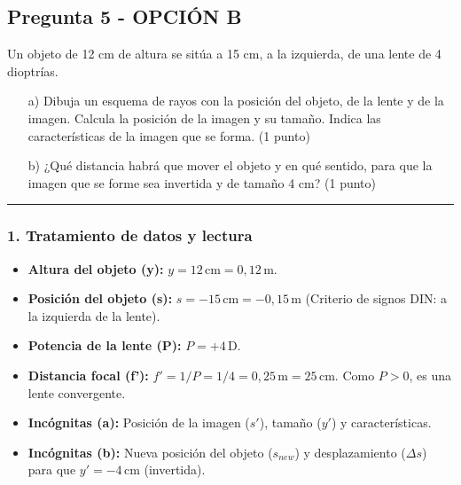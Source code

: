 \subsection{Pregunta 5 - OPCIÓN B}
\label{subsec:5B_2025_jun_ord}

\begin{cajaenunciado}
Un objeto de 12 cm de altura se sitúa a 15 cm, a la izquierda, de una lente de 4 dioptrías.
\begin{enumerate}
    \item[a)] Dibuja un esquema de rayos con la posición del objeto, de la lente y de la imagen. Calcula la posición de la imagen y su tamaño. Indica las características de la imagen que se forma. (1 punto)
    \item[b)] ¿Qué distancia habrá que mover el objeto y en qué sentido, para que la imagen que se forme sea invertida y de tamaño 4 cm? (1 punto)
\end{enumerate}
\end{cajaenunciado}
\hrule

\subsubsection*{1. Tratamiento de datos y lectura}
\begin{itemize}
    \item \textbf{Altura del objeto (y):} $y = 12 \, \text{cm} = 0,12 \, \text{m}$.
    \item \textbf{Posición del objeto (s):} $s = -15 \, \text{cm} = -0,15 \, \text{m}$ (Criterio de signos DIN: a la izquierda de la lente).
    \item \textbf{Potencia de la lente (P):} $P = +4 \, \text{D}$.
    \item \textbf{Distancia focal (f'):} $f' = 1/P = 1/4 = 0,25 \, \text{m} = 25 \, \text{cm}$. Como $P>0$, es una lente convergente.
    \item \textbf{Incógnitas (a):} Posición de la imagen ($s'$), tamaño ($y'$) y características.
    \item \textbf{Incógnitas (b):} Nueva posición del objeto ($s_{new}$) y desplazamiento ($\Delta s$) para que $y' = -4 \, \text{cm}$ (invertida).
\end{itemize}

